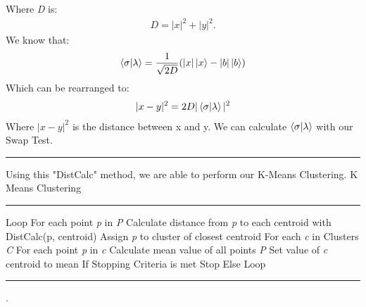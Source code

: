 \documentclass[conference]{IEEEtran}
\begin{document}
Where \emph{D} is: 
\begin{align*}
D = |x|^2+|y|^2. 
\end{align*}  
We know that:  
\begin{align*}
 \bra{\sigma}\ket{\lambda} = \frac{1}{\sqrt{2D}}(|x|\ket{x} - |b|\ket{b})
\end{align*} 
Which can be rearranged to: 
\begin{align*}
|x-y|^2 = 2D|\bra{\sigma}\ket{\lambda}|^2
\end{align*} 
Where $|x-y|^2$ is the distance between x and y. We can calculate $\bra{\sigma}\ket{\lambda}$ with our Swap Test. 
\newline
\noindent\rule{\columnwidth}{1pt}
\newline
\indent Using this "DistCalc" method, we are able to perform our K-Means Clustering. \newline
\newline
{\large K Means Clustering} \newline
\noindent\rule{\columnwidth}{1pt}
Loop \newline
\indent For each point \emph{p} in \emph{P} \newline
\indent \indent Calculate distance from \emph{p} to each centroid with \newline 
\indent \indent DistCalc(p, centroid) \newline
\indent \indent Assign \emph{p} to cluster of closest centroid \newline
\indent For each \emph{c} in Clusters \emph{C} \newline
\indent \indent For each point \emph{p} in \emph{c} \newline
\indent \indent \indent Calculate mean value of all points \emph{P} \newline
\indent \indent \indent Set value of \emph{c} centroid to mean \newline
\indent If Stopping Criteria is met \newline
\indent \indent Stop \newline
\indent Else \newline
\indent\indent Loop \newline
\noindent\rule{\columnwidth}{1pt}
\cite{b6}.
\end{document}
